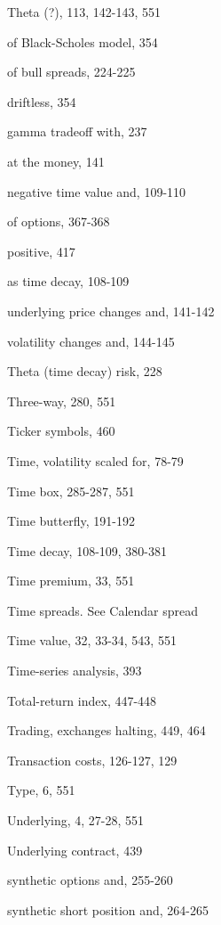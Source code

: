 \noindent Theta (?), 113, 142-143, 551\par
\noindent of Black-Scholes model, 354\par
\noindent of bull spreads, 224-225\par
\noindent driftless, 354\par
\noindent gamma tradeoff with, 237\par
\noindent at the money, 141\par
\noindent negative time value and, 109-110\par
\noindent of options, 367-368\par
\noindent positive, 417\par
\noindent as time decay, 108-109\par
\noindent underlying price changes and, 141-142\par
\noindent volatility changes and, 144-145\par
\noindent Theta (time decay) risk, 228\par
\noindent Three-way, 280, 551\par
\noindent Ticker symbols, 460\par
\noindent Time, volatility scaled for, 78-79\par
\noindent Time box, 285-287, 551\par
\noindent Time butterfly, 191-192\par
\noindent Time decay, 108-109, 380-381\par
\noindent Time premium, 33, 551\par
\noindent Time spreads. See Calendar spread\par
\noindent Time value, 32, 33-34, 543, 551\par
\noindent Time-series analysis, 393\par
\noindent Total-return index, 447-448\par
\noindent Trading, exchanges halting, 449, 464\par
\noindent Transaction costs, 126-127, 129\par
\noindent Type, 6, 551\par
\noindent Underlying, 4, 27-28, 551\par
\noindent Underlying contract, 439\par
\noindent synthetic options and, 255-260\par
\noindent synthetic short position and, 264-265\par

